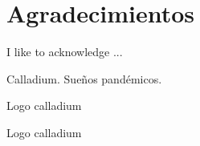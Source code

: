 \documentclass[12pt]{book}
\begin{document}
\newpage
\chapter*{Agradecimientos}
\thispagestyle{empty}

I like to acknowledge ...

\newpage

\pagecolor{titlepagecolor2}
\color{white}

\begin{colophon} 
Calladium. Sueños pandémicos.
\end{colophon}

\newpage
Logo calladium

\clearpage
\newpage

\pagecolor{titlepagecolor}
Logo calladium
\end{document}
